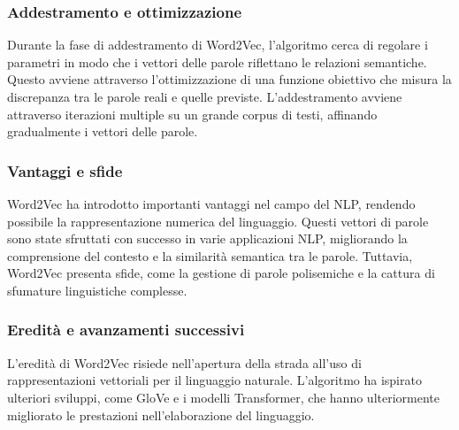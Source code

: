 \subsubsection{Addestramento e ottimizzazione}
Durante la fase di addestramento di Word2Vec, l'algoritmo cerca di regolare i parametri in modo che i vettori delle parole riflettano le relazioni semantiche. Questo avviene attraverso l'ottimizzazione di una funzione obiettivo che misura la discrepanza tra le parole reali e quelle previste. L'addestramento avviene attraverso iterazioni multiple su un grande corpus di testi, affinando gradualmente i vettori delle parole.

\subsubsection{Vantaggi e sfide}
Word2Vec ha introdotto importanti vantaggi nel campo del NLP, rendendo possibile la rappresentazione numerica del linguaggio. Questi vettori di parole sono state sfruttati con successo in varie applicazioni NLP, migliorando la comprensione del contesto e la similarità semantica tra le parole. Tuttavia, Word2Vec presenta sfide, come la gestione di parole polisemiche e la cattura di sfumature linguistiche complesse.

\subsubsection{Eredità e avanzamenti successivi}
L'eredità di Word2Vec risiede nell'apertura della strada all'uso di rappresentazioni vettoriali per il linguaggio naturale. L'algoritmo ha ispirato ulteriori sviluppi, come GloVe e i modelli Transformer, che hanno ulteriormente migliorato le prestazioni nell'elaborazione del linguaggio.

